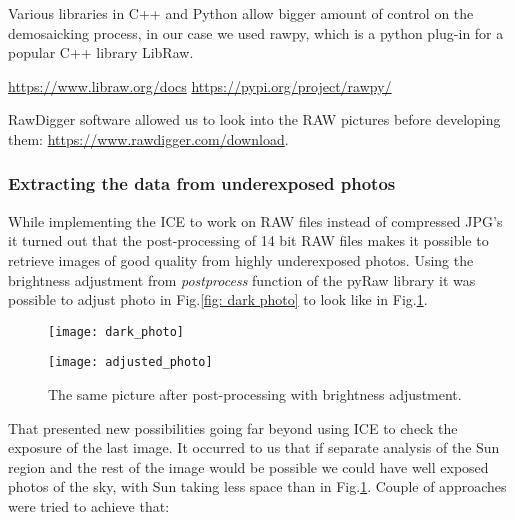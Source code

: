 \documentclass[]{book}
\begin{document}
		Various libraries in C++ and Python allow bigger amount of control on the demosaicking process, in our case we used rawpy, which is a python plug-in for a popular C++ library LibRaw.
		
		\url{https://www.libraw.org/docs} 
		\url{https://pypi.org/project/rawpy/}
		
		RawDigger software allowed us to look into the RAW pictures before developing them: \url{https://www.rawdigger.com/download}.
		
		\subsubsection{Extracting the data from underexposed photos}
		
		While implementing the ICE to work on RAW files instead of compressed JPG's it turned out that the post-processing of 14 bit RAW files makes it possible to retrieve images of good quality from highly underexposed photos. Using the brightness adjustment from \textit{postprocess} function of the pyRaw library it was possible to adjust photo in Fig.\ref{fig: dark photo} to look like in Fig.\ref{fig: adjusted photo}.
		
		\begin{figure}
			\centering
			\begin{minipage}{0.45\textwidth}
				\centering
				\texttt{[image: dark\_photo]}
				\label{fig: dark photo}
				\caption{Picture of the sky made with greyscale filter. ISO: 50, shutter speed: 1/500 s.}
			\end{minipage}\hfill
			\begin{minipage}{0.45\textwidth}
				\centering
				\texttt{[image: adjusted\_photo]}
				\label{fig: adjusted photo}
				\caption{The same picture after post-processing with brightness adjustment.}
			\end{minipage}
		\end{figure}
		
		That presented new possibilities going far beyond using ICE to check the exposure of the last image. It occurred to us that if separate analysis of the Sun region and the rest of the image would be possible we could have well exposed photos of the sky, with Sun taking less space than in Fig.\ref{fig: adjusted photo}. Couple of approaches were tried to achieve that:
		
\end{document}
